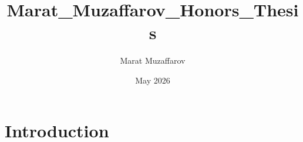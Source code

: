 \documentclass{article}
\title{Marat_Muzaffarov_Honors_Thesis}
\author{Marat Muzaffarov}
\date{May 2026}
\begin{document}
\maketitle

\section{Introduction}
\end{document}
